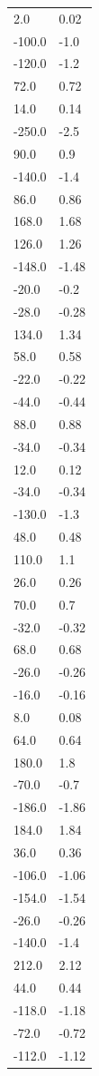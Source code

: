 \begin{longtable}{ll}
2.0 & 0.02 \\
-100.0 & -1.0 \\
-120.0 & -1.2 \\
72.0 & 0.72 \\
14.0 & 0.14 \\
-250.0 & -2.5 \\
90.0 & 0.9 \\
-140.0 & -1.4 \\
86.0 & 0.86 \\
168.0 & 1.68 \\
126.0 & 1.26 \\
-148.0 & -1.48 \\
-20.0 & -0.2 \\
-28.0 & -0.28 \\
134.0 & 1.34 \\
58.0 & 0.58 \\
-22.0 & -0.22 \\
-44.0 & -0.44 \\
88.0 & 0.88 \\
-34.0 & -0.34 \\
12.0 & 0.12 \\
-34.0 & -0.34 \\
-130.0 & -1.3 \\
48.0 & 0.48 \\
110.0 & 1.1 \\
26.0 & 0.26 \\
70.0 & 0.7 \\
-32.0 & -0.32 \\
68.0 & 0.68 \\
-26.0 & -0.26 \\
-16.0 & -0.16 \\
8.0 & 0.08 \\
64.0 & 0.64 \\
180.0 & 1.8 \\
-70.0 & -0.7 \\
-186.0 & -1.86 \\
184.0 & 1.84 \\
36.0 & 0.36 \\
-106.0 & -1.06 \\
-154.0 & -1.54 \\
-26.0 & -0.26 \\
-140.0 & -1.4 \\
212.0 & 2.12 \\
44.0 & 0.44 \\
-118.0 & -1.18 \\
-72.0 & -0.72 \\
-112.0 & -1.12 \\

\end{longtable}
